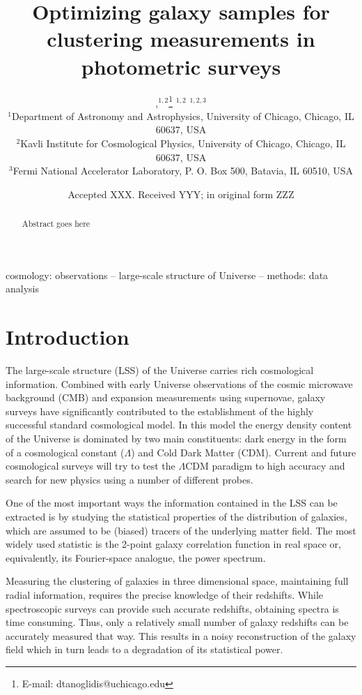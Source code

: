 \documentclass[a4paper,fleqn,usenatbib]{mnras}
\title[Galaxy samples in photo-z surveys]{Optimizing galaxy samples for clustering measurements in photometric surveys}
\author[D. Tanoglidis et al.]{
,$^{1,2}$\thanks{E-mail: dtanoglidis@uchicago.edu}
$^{1,2}$
$^{1,2,3}$
\\
$^{1}$Department of Astronomy and Astrophysics, University of Chicago, Chicago, IL 60637, USA \\
$^{2}$Kavli Institute for Cosmological Physics, University of Chicago, Chicago, IL 60637, USA\\
$^{3}$Fermi National Accelerator Laboratory, P. O. Box 500, Batavia, IL 60510, USA
}
\date{Accepted XXX. Received YYY; in original form ZZZ}
\begin{document}
\label{firstpage}
\pagerange{\pageref{firstpage}--\pageref{lastpage}}
\maketitle

\begin{abstract}
Abstract goes here
\end{abstract}

\begin{keywords}
cosmology: observations -- large-scale structure of Universe -- methods: data analysis
\end{keywords}



\section{Introduction}
\label{sec: Intro}


The large-scale structure (LSS) of the Universe carries rich cosmological information. Combined with early Universe observations of the cosmic microwave background (CMB) and expansion measurements using supernovae, galaxy surveys have significantly contributed to the establishment of the highly successful standard cosmological model. In this model the energy density content of the Universe is dominated by two main constituents: dark energy in the form of a cosmological constant ($\Lambda$) and Cold Dark Matter (CDM). Current and future cosmological surveys will try to test the $\Lambda$CDM paradigm to high accuracy and search for new physics using a number of different probes.

One of the most important ways the information contained in the LSS can be extracted is by studying the statistical properties of the distribution of galaxies, which are assumed to be (biased) tracers of the underlying matter field. The most widely used statistic is the 2-point galaxy correlation function in real space or, equivalently, its Fourier-space analogue, the power spectrum.

Measuring the clustering of galaxies in three dimensional space, maintaining full radial information, requires the precise knowledge of their redshifts. While spectroscopic surveys can provide such accurate redshifts,  obtaining spectra is time consuming. Thus, only a relatively small number of galaxy redshifts  can be accurately measured that way. This results in a noisy reconstruction of the galaxy field which in turn leads to a degradation of its statistical power. 
\end{document}
